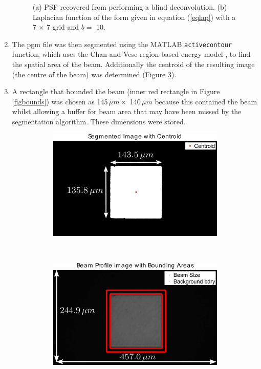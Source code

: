 \begin{enumerate}
\begin{figure}
\begin{subfigure}[b]{0.9\textwidth}
                \caption{}
                \label{figmodelpsf}
        \end{subfigure}
        \caption{(a) PSF recovered from performing a blind deconvolution. (b) Laplacian function of the form given in equation (\ref{eqlap}) with a 7 $\times$ 7 grid and $b =$ 10.}
        \label{figpsfs}
\end{figure}
\item The pgm file was then segmented using the MATLAB \verb+activecontour+ function, which uses the Chan and Vese region based energy model \cite{chan2001}, to find the spatial area of the beam.
Additionally the centroid of the resulting image (the centre of the beam) was determined (Figure \ref{figcentroid}).
\item A rectangle that bounded the beam (inner red rectangle in Figure \ref{figbounds}) was chosen as 145$\, \mu m \times$ 140$\, \mu m$ because this contained the beam whilst allowing a buffer for beam area that may have been missed by the segmentation algorithm.
These dimensions were stored.
\begin{figure}
        \centering
        \begin{subfigure}[b]{0.9\textwidth}
                \centering
                \includegraphics[width=\textwidth]{figures/beam/seg_image.pdf}
                \caption{}
                \label{figcentroid}
        \end{subfigure}
				\\
        \begin{subfigure}[b]{0.9\textwidth}
                \centering
                \includegraphics[width=\textwidth]{figures/beam/bounding_areas2.pdf}

\end{subfigure}
\end{figure}
\end{enumerate}
